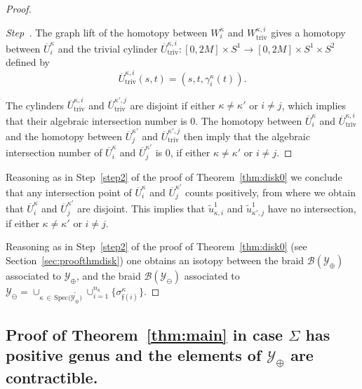 \documentclass[AHL,Unicode,longabstracts,published]{cedram}
\newcommand{\Spec}{\mathrm{Spec}}
\newcommand{\rtriv}{\mathrm{triv}}
\newcommand{\clY}{\mathcal{Y}}
\newcommand{\clB}{\mathcal{B}}
\newcommand{\fkf}{\mathfrak{f}}
\newcounter{stepcount}
\newenvironment{step}{\refstepcounter{stepcount}\begin{proof}[Step~\thestepcount]}{\let\qed\relax\end{proof}}
\begin{document}
\begin{proof}
\begin{step}
The graph lift of the homotopy between ${W}^{\kappa}_i$ and ${W}^{\kappa,i}_{\rtriv}$ gives a homotopy between $\overline{U}^\kappa_i$ and the trivial cylinder $\overline{U}^{\kappa,i}_{\rtriv}:[0,2M] \times S^1 \to [0,2M] \times S^1 \times S^2 $ defined by
\[
\overline{U}^{\kappa,i}_{\rtriv}(s,t) = (s,t, \gamma^\kappa_i(t)).
\]

The cylinders $\overline{U}^{\kappa,i}_{\rtriv}$ and $\overline{U}^{\kappa',j}_{\rtriv}$ are disjoint if either $\kappa\neq \kappa'$ or $i\neq j$, which implies that their algebraic intersection number is $0$. The homotopy between $\overline{U}^{\kappa}_i$ and $\overline{U}^{\kappa,i}_{\rtriv}$ and the homotopy between $\overline{U}^{\kappa'}_j$ and $\overline{U}^{\kappa',j}_{\rtriv}$ then imply that the algebraic intersection number of $\overline{U}^{\kappa}_i$ and $\overline{U}^{\kappa'}_j$ is $0$, if either $\kappa\neq \kappa'$ or $i\neq j$.
\end{step}

Reasoning as in Step~\ref{step2} of the proof of Theorem~\ref{thm:disk0} we conclude that any intersection point of $\overline{U}^{\kappa}_i$ and $\overline{U}^{\kappa'}_j$ counts positively, from where we obtain that $\overline{U}^{\kappa}_i$ and $\overline{U}^{\kappa'}_j$ are disjoint. This implies that $\widetilde{u}^1_{\kappa,i}$ and $\widetilde{u}^1_{\kappa',j}$ have no intersection, if either $\kappa\neq \kappa'$ or $i\neq j$.

Reasoning as in Step~\ref{step2} of the proof of Theorem~\ref{thm:disk0} (see Section~\ref{sec:proofthmdisk}) one obtains an isotopy between the braid $\clB(\clY_\oplus)$ associated to $\clY_\oplus$, and the braid $\clB(\clY_\ominus)$ associated to $\clY_\ominus= \cup_{\kappa\,\in \,\Spec(\widetilde{\clY_\oplus)}} \cup^{n_\kappa}_{i=1} \{\sigma^\kappa_{\fkf(i)}\}$. 
\end{proof}

\subsection{Proof of Theorem~\ref{thm:main} in case \texorpdfstring{$\Sigma$}{Sigma} has positive genus and the elements of \texorpdfstring{$\clY_\oplus$}{Y(+)} are contractible.}
\end{document}
